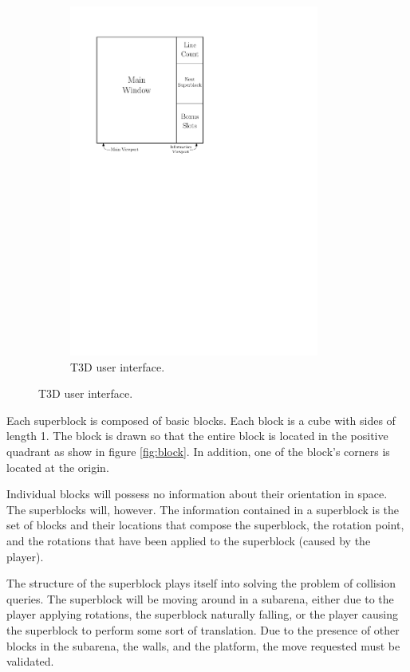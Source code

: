 \begin{figure}
\begin{subfigure}[b]{0.4\textwidth}
		\includegraphics[width=0.9\textwidth]{meetings/pics/userInter.pdf}
		\caption{T3D user interface.}
		\label{fig:userInter}
	\end{subfigure}
\end{figure}

Each superblock is composed of basic blocks. Each block is a cube with sides of
length 1. The block is drawn so that the entire block is located in the
positive quadrant as show in figure \ref{fig:block}. In addition, one of the
block's corners is located at the origin. 

Individual blocks will possess no information about their orientation in space.
The superblocks will, however. The information contained in a superblock is the
set of blocks and their locations that compose the superblock, the rotation
point, and the rotations that have been applied to the superblock (caused by
the player).

The structure of the superblock plays itself into solving the problem of
collision queries. The superblock will be moving around in a subarena, either
due to the player applying rotations, the superblock naturally falling, or the
player causing the superblock to perform some sort of translation. Due to the
presence of other blocks in the subarena, the walls, and the platform, the move
requested must be validated.

